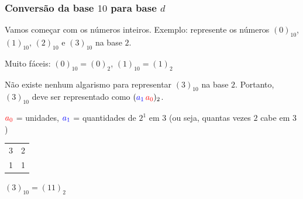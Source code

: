 \documentclass{beamer}
\begin{document}

\begin{frame}
\frametitle{Conversão da base $10$ para base $d$}

Vamos começar com os números inteiros.
Exemplo: represente os números $(0)_{10}$, $(1)_{10}$, $(2)_{10}$ e $(3)_{10}$ na base $2$.

\vspace{12pt}
\pause

Muito fáceis: $(0)_{10} = (0)_2$, $(1)_{10} = (1)_2$

\vspace{12pt}
\pause

Não existe nenhum algarismo para representar $(3)_{10}$ na base $2$. Portanto, $(3)_{10}$ deve ser representado como $({\color{blue}a_1} \, {\color{red}a_0})_2$.

\vspace{12pt}
\pause

${\color{red}a_0}$ = unidades, ${\color{blue}a_1}$ = quantidades de $2^1$ em $3$ (ou seja, quantas vezes $2$ cabe em $3$)

\pause

\begin{center}
\begin{tabular}{c|c}
3 & 2 \\
\cline{2-2}
{\color{red}1} & {\color{blue}1}
\end{tabular}

$(3)_{10} = (11)_2$
\end{center}

\end{frame}


\setlength{\unitlength}{15pt}

\newcommand{\R}[1]{{\color{red}#1}}
\newcommand{\ARR}[1]{\begin{picture}(0,0)\put(0,0){\vector(-3,2){#1}}\end{picture}}
\end{document}
